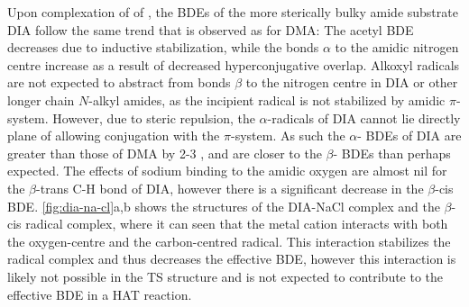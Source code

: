 Upon complexation of  of , the BDEs of the more sterically
bulky amide substrate DIA follow the same trend that is observed as for DMA: The
acetyl  BDE decreases due to inductive stabilization, while the 
bonds $\alpha$ to the amidic nitrogen centre increase as a result of decreased
hyperconjugative overlap. Alkoxyl radicals are not expected to abstract from
 bonds $\beta$ to the nitrogen centre in DIA or other longer chain
$N$-alkyl amides, as the incipient radical is not stabilized by amidic
$\pi$-system. However, due to steric repulsion, the $\alpha$-radicals of DIA
cannot lie directly plane of allowing conjugation with the $\pi$-system. As such
the $\alpha$- BDEs of DIA are greater than those of DMA by 2-3 \kcalmol,
and are closer to the $\beta$- BDEs than perhaps expected. The effects
of sodium binding to the amidic oxygen are almost nil for the $\beta$-trans C-H
bond of DIA, however there is a significant decrease in the $\beta$-cis 
BDE. \ref{fig:dia-na-cl}a,b shows the structures of the DIA-NaCl complex and the
$\beta$-cis radical complex, where it can seen that the metal cation interacts
with both the oxygen-centre and the carbon-centred radical. This interaction
stabilizes the radical complex and thus decreases the effective BDE, however
this interaction is likely not possible in the TS structure and is not expected
to contribute to the effective BDE in a HAT reaction.

